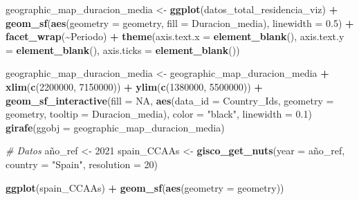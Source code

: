 \documentclass[data,article,submit,moreauthors,pdftex]{Definitions/mdpi}
\newenvironment{Shaded}{\begin{snugshade}}{\end{snugshade}}
\newcommand{\AttributeTok}[1]{\textcolor[rgb]{0.13,0.29,0.53}{#1}}
\newcommand{\CommentTok}[1]{\textcolor[rgb]{0.56,0.35,0.01}{\textit{#1}}}
\newcommand{\ConstantTok}[1]{\textcolor[rgb]{0.56,0.35,0.01}{#1}}
\newcommand{\DecValTok}[1]{\textcolor[rgb]{0.00,0.00,0.81}{#1}}
\newcommand{\FloatTok}[1]{\textcolor[rgb]{0.00,0.00,0.81}{#1}}
\newcommand{\FunctionTok}[1]{\textcolor[rgb]{0.13,0.29,0.53}{\textbf{#1}}}
\newcommand{\NormalTok}[1]{#1}
\newcommand{\OtherTok}[1]{\textcolor[rgb]{0.56,0.35,0.01}{#1}}
\newcommand{\SpecialCharTok}[1]{\textcolor[rgb]{0.81,0.36,0.00}{\textbf{#1}}}
\newcommand{\StringTok}[1]{\textcolor[rgb]{0.31,0.60,0.02}{#1}}
\begin{document}
\begin{Shaded}
\begin{Highlighting}[]
\NormalTok{geographic\_map\_duracion\_media }\OtherTok{\textless{}{-}} \FunctionTok{ggplot}\NormalTok{(datos\_total\_residencia\_viz) }\SpecialCharTok{+}
    \FunctionTok{geom\_sf}\NormalTok{(}\FunctionTok{aes}\NormalTok{(}\AttributeTok{geometry =}\NormalTok{ geometry, }\AttributeTok{fill =}\NormalTok{ Duracion\_media),}
        \AttributeTok{linewidth =} \FloatTok{0.5}\NormalTok{) }\SpecialCharTok{+} \FunctionTok{facet\_wrap}\NormalTok{(}\SpecialCharTok{\textasciitilde{}}\NormalTok{Periodo) }\SpecialCharTok{+} \FunctionTok{theme}\NormalTok{(}\AttributeTok{axis.text.x =} \FunctionTok{element\_blank}\NormalTok{(),}
    \AttributeTok{axis.text.y =} \FunctionTok{element\_blank}\NormalTok{(), }\AttributeTok{axis.ticks =} \FunctionTok{element\_blank}\NormalTok{())}

\NormalTok{geographic\_map\_duracion\_media }\OtherTok{\textless{}{-}}\NormalTok{ geographic\_map\_duracion\_media }\SpecialCharTok{+}
    \FunctionTok{xlim}\NormalTok{(}\FunctionTok{c}\NormalTok{(}\DecValTok{2200000}\NormalTok{, }\DecValTok{7150000}\NormalTok{)) }\SpecialCharTok{+} \FunctionTok{ylim}\NormalTok{(}\FunctionTok{c}\NormalTok{(}\DecValTok{1380000}\NormalTok{, }\DecValTok{5500000}\NormalTok{)) }\SpecialCharTok{+} \FunctionTok{geom\_sf\_interactive}\NormalTok{(}\AttributeTok{fill =} \ConstantTok{NA}\NormalTok{,}
    \FunctionTok{aes}\NormalTok{(}\AttributeTok{data\_id =}\NormalTok{ Country\_Ids, }\AttributeTok{geometry =}\NormalTok{ geometry, }\AttributeTok{tooltip =}\NormalTok{ Duracion\_media),}
    \AttributeTok{color =} \StringTok{"black"}\NormalTok{, }\AttributeTok{linewidth =} \FloatTok{0.1}\NormalTok{)}
\FunctionTok{girafe}\NormalTok{(}\AttributeTok{ggobj =}\NormalTok{ geographic\_map\_duracion\_media)}
\end{Highlighting}
\end{Shaded}

\begin{Shaded}
\begin{Highlighting}[]
\CommentTok{\# Datos}
\NormalTok{año\_ref }\OtherTok{\textless{}{-}} \DecValTok{2021}
\NormalTok{spain\_CCAAs }\OtherTok{\textless{}{-}} \FunctionTok{gisco\_get\_nuts}\NormalTok{(}\AttributeTok{year =}\NormalTok{ año\_ref, }\AttributeTok{country =} \StringTok{"Spain"}\NormalTok{,}
    \AttributeTok{resolution =} \DecValTok{20}\NormalTok{)}

\FunctionTok{ggplot}\NormalTok{(spain\_CCAAs) }\SpecialCharTok{+} \FunctionTok{geom\_sf}\NormalTok{(}\FunctionTok{aes}\NormalTok{(}\AttributeTok{geometry =}\NormalTok{ geometry))}
\end{Highlighting}
\end{Shaded}
\end{document}
